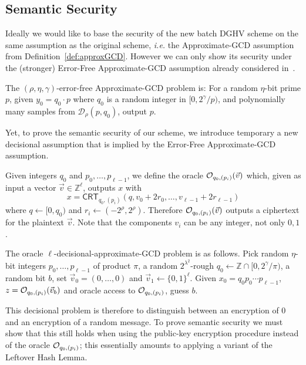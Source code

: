 \documentclass{llncs}
\newcommand{\ie}{\textsl{i.e.}\xspace}
\newcommand{\Z}{{\mathbb Z}}
\newcommand*{\crt}{\ensuremath{\mathsf{CRT}}}
\begin{document}
\subsection{Semantic Security}\label{sec:semantic-security}

Ideally we would like to base the security of the new batch DGHV scheme on
the same assumption as the original scheme, \ie the
Approximate-GCD assumption from Definition~\ref{def:approxGCD}.
However we can only show its security under the
(stronger) Error-Free Approximate-GCD assumption already considered in~\cite{CMNT2011,CNT2012}.
\begin{definition} 
The $(\rho, \eta,{\gamma})$-error-free Appro\-xi\-ma\-te-GCD pro\-blem
is: For a random $\eta$-bit prime $p$, given $y_0=q_0\cdot p$
where $q_0$ is a random integer in $[0,
  2^{\gamma}/p)$, and polynomially many samples from $\mathcal
  D_\rho(p,q_0)$, output $p$. 
\end{definition} 

Yet, to prove the semantic security of our scheme, 
we introduce temporary a new decisional assumption that is implied by the 
Error-Free Approximate-GCD assumption.

Given integers $q_0$ and $p_0,\ldots,p_{\ell-1}$, we define the oracle
${\cal O}_{q_0,(p_i)}(\vec{v})$ which, given as input a vector $\vec{v} \in {\mathbb
  Z}^\ell$, outputs $x$ with
$$ x = \crt_{q_0,(p_i)}(q,v_0+2r_0,\ldots,v_{\ell-1}+2r_{\ell-1})$$
where $q \leftarrow [0,q_0)$ and $r_i \leftarrow
    (-2^\rho,2^\rho)$. Therefore ${\cal O}_{q_0,(p_i)}(\vec{v})$
    outputs a ciphertext for the plaintext $\vec{v}$. Note that the
    components $v_i$ can be any integer, not only $0,1$.

\begin{definition} The
  oracle $\ell$-decisional-approximate-GCD problem is as
  follows. Pick random $\eta$-bit 
  integers $p_0,\ldots,p_{\ell-1}$ of product $\pi$, a random
  $2^{\lambda^2}$-rough $q_0 \leftarrow \Z \cap  
  [0,2^{\gamma}/\pi)$, a random bit $b$, set $\vec{v}_0=
  (0,\ldots,0)$
and $\vec{v}_1\leftarrow
  \{0,1\}^\ell$. Given  $x_0=q_0p_0\cdots p_{\ell-1}$, $z={\cal O}_{q_0,(p_i)}(\vec{v}_b)$ and oracle access to ${\cal
    O}_{q_0,(p_i)}$, guess $b$.
\end{definition}
 
This decisional
problem is therefore to distinguish between an encryption of $0$ and
an encryption of a random message. To prove semantic security 
we must show that this  still holds when using the public-key
encryption procedure instead of the oracle ${\cal 
    O}_{q_0,(p_i)}$; this essentially amounts to applying a variant
                    of the Leftover Hash Lemma.
\end{document}
